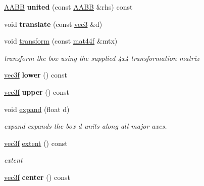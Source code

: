 \begin{DoxyCompactItemize}
\item 
\hypertarget{classps_1_1base_1_1AABB_a7ff5cdac8ad71f886314427621880692}{}\hyperlink{classps_1_1base_1_1AABB}{A\+A\+B\+B} {\bfseries united} (const \hyperlink{classps_1_1base_1_1AABB}{A\+A\+B\+B} \&rhs) const \label{classps_1_1base_1_1AABB_a7ff5cdac8ad71f886314427621880692}

\item 
\hypertarget{classps_1_1base_1_1AABB_a6e0a8b1cd74335409764c0ad668e3672}{}void {\bfseries translate} (const \hyperlink{classps_1_1base_1_1Vec3}{vec3} \&d)\label{classps_1_1base_1_1AABB_a6e0a8b1cd74335409764c0ad668e3672}

\item 
void \hyperlink{classps_1_1base_1_1AABB_a04e2a65274fe57893554ab750bcb6c42}{transform} (const \hyperlink{classps_1_1base_1_1Matrix}{mat44f} \&mtx)
\begin{DoxyCompactList}\small\item\em transform the box using the supplied 4x4 transformation matrix \end{DoxyCompactList}\item 
\hypertarget{classps_1_1base_1_1AABB_a2cfeba4f0ea377a81d4836599faae23e}{}\hyperlink{classps_1_1base_1_1Vec3}{vec3f} {\bfseries lower} () const \label{classps_1_1base_1_1AABB_a2cfeba4f0ea377a81d4836599faae23e}

\item 
\hypertarget{classps_1_1base_1_1AABB_ae9b8e09364a05b36fc994cfd78186a25}{}\hyperlink{classps_1_1base_1_1Vec3}{vec3f} {\bfseries upper} () const \label{classps_1_1base_1_1AABB_ae9b8e09364a05b36fc994cfd78186a25}

\item 
void \hyperlink{classps_1_1base_1_1AABB_a178a579406abb3aa4461b376445a5b17}{expand} (float d)
\begin{DoxyCompactList}\small\item\em expand expands the box d units along all major axes. \end{DoxyCompactList}\item 
\hyperlink{classps_1_1base_1_1Vec3}{vec3f} \hyperlink{classps_1_1base_1_1AABB_a343c4d7ff970f350511defb7b4beb0d5}{extent} () const 
\begin{DoxyCompactList}\small\item\em extent \end{DoxyCompactList}\item 
\hypertarget{classps_1_1base_1_1AABB_a3b3b4c49b9449c4bff38c48918cbda5e}{}\hyperlink{classps_1_1base_1_1Vec3}{vec3f} {\bfseries center} () const \label{classps_1_1base_1_1AABB_a3b3b4c49b9449c4bff38c48918cbda5e}


\end{DoxyCompactItemize}
